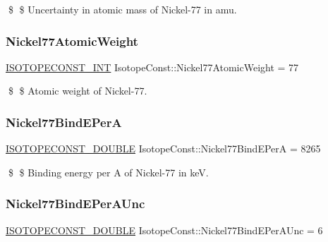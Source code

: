 \$ \$ Uncertainty in atomic mass of Nickel-\/77 in amu. \mbox{\label{group___isotope_const-_nickel-_ni77_ga90940dce71dab8ac49f07c2e46f87351}} 
\subsubsection{\texorpdfstring{Nickel77\+Atomic\+Weight}{Nickel77AtomicWeight}}
{\footnotesize\ttfamily \mbox{\hyperlink{group___isotope_const-_macros_ga5f18360b3e99483a35c32d789e62621c}{I\+S\+O\+T\+O\+P\+E\+C\+O\+N\+S\+T\+\_\+\+I\+NT}} Isotope\+Const\+::\+Nickel77\+Atomic\+Weight = 77}

\$ \$ Atomic weight of Nickel-\/77. \mbox{\label{group___isotope_const-_nickel-_ni77_ga62187619352e3767ff018ada30003841}} 
\subsubsection{\texorpdfstring{Nickel77\+Bind\+E\+PerA}{Nickel77BindEPerA}}
{\footnotesize\ttfamily \mbox{\hyperlink{group___isotope_const-_macros_ga8f45a7272ce02c0b4c65c44636ed719a}{I\+S\+O\+T\+O\+P\+E\+C\+O\+N\+S\+T\+\_\+\+D\+O\+U\+B\+LE}} Isotope\+Const\+::\+Nickel77\+Bind\+E\+PerA = 8265}

\$ \$ Binding energy per A of Nickel-\/77 in keV. \mbox{\label{group___isotope_const-_nickel-_ni77_ga949ec159456326726b8d7ae4d6b2df7a}} 
\subsubsection{\texorpdfstring{Nickel77\+Bind\+E\+Per\+A\+Unc}{Nickel77BindEPerAUnc}}
{\footnotesize\ttfamily \mbox{\hyperlink{group___isotope_const-_macros_ga8f45a7272ce02c0b4c65c44636ed719a}{I\+S\+O\+T\+O\+P\+E\+C\+O\+N\+S\+T\+\_\+\+D\+O\+U\+B\+LE}} Isotope\+Const\+::\+Nickel77\+Bind\+E\+Per\+A\+Unc = 6}

